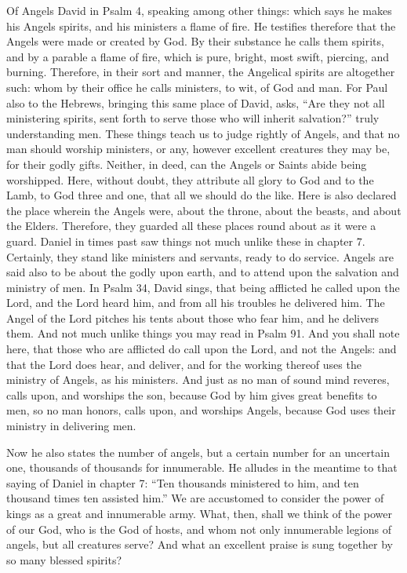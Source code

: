Of Angels David in Psalm 4, speaking among other things: which says he makes his Angels spirits, and his ministers a flame of fire. He testifies therefore that the Angels were made or created by God. By their substance he calls them spirits, and by a parable a flame of fire, which is pure, bright, most swift, piercing, and burning. Therefore, in their sort and manner, the Angelical spirits are altogether such: whom by their office he calls ministers, to wit, of God and man. For Paul also to the Hebrews, bringing this same place of David, asks, “Are they not all ministering spirits, sent forth to serve those who will inherit salvation?” truly understanding men. These things teach us to judge rightly of Angels, and that no man should worship ministers, or any, however excellent creatures they may be, for their godly gifts. Neither, in deed, can the Angels or Saints abide being worshipped. Here, without doubt, they attribute all glory to God and to the Lamb, to God three and one, that all we should do the like. Here is also declared the place wherein the Angels were, about the throne, about the beasts, and about the Elders. Therefore, they guarded all these places round about as it were a guard. Daniel in times past saw things not much unlike these in chapter 7. Certainly, they stand like ministers and servants, ready to do service. Angels are said also to be about the godly upon earth, and to attend upon the salvation and ministry of men. In Psalm 34, David sings, that being afflicted he called upon the Lord, and the Lord heard him, and from all his troubles he delivered him. The Angel of the Lord pitches his tents about those who fear him, and he delivers them. And not much unlike things you may read in Psalm 91. And you shall note here, that those who are afflicted do call upon the Lord, and not the Angels: and that the Lord does hear, and deliver, and for the working thereof uses the ministry of Angels, as his ministers. And just as no man of sound mind reveres, calls upon, and worships the son, because God by him gives great benefits to men, so no man honors, calls upon, and worships Angels, because God uses their ministry in delivering men.

Now he also states the number of angels, but a certain number for an uncertain one, thousands of thousands for innumerable. He alludes in the meantime to that saying of Daniel in chapter 7: “Ten thousands ministered to him, and ten thousand times ten assisted him.” We are accustomed to consider the power of kings as a great and innumerable army. What, then, shall we think of the power of our God, who is the God of hosts, and whom not only innumerable legions of angels, but all creatures serve? And what an excellent praise is sung together by so many blessed spirits?

